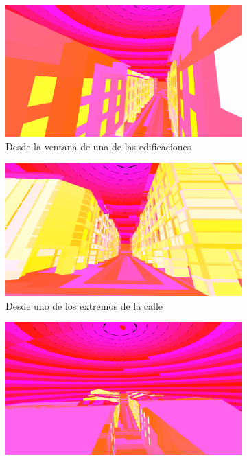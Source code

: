 \begin{figure}[htbp]
	\centering
	\begin{subfigure}{0.45\textwidth}
		\includegraphics[width=1\linewidth]{assets/street1}
		\caption{Desde la ventana de una de las edificaciones}
	\end{subfigure}
	\begin{subfigure}{0.45\textwidth}
		\includegraphics[width=1\linewidth]{assets/street2}
		\caption{Desde uno de los extremos de la calle}
	\end{subfigure}
	\begin{subfigure}{0.45\textwidth}
		\includegraphics[width=1\linewidth]{assets/street3}

\end{subfigure}
\end{figure}
